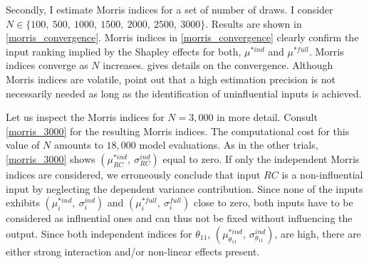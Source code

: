 Secondly, I estimate Morris indices for a set of number of draws. I consider $N \in \{100,\ 500,\ 1000,\ 1500,\ 2000,\ 2500,\ 3000\}$. Results are shown in \cref{morris_convergence}. Morris indices in
\cref{morris_convergence} clearly confirm the input ranking implied by the Shapley effects for both, $\mu^{\ast ind}$ and $\mu^{\ast full}$. Morris indices
converge as $N$ increases.  gives details on the convergence. Although Morris indices are volatile, \citet{GM17} point out that a high estimation precision is not necessarily needed
as long as the identification of uninfluential inputs is achieved.

Let us inspect the Morris indices for $N = 3,000$ in more detail. Consult \cref{morris_3000} for the
resulting Morris indices. The computational cost for this value of $N$ amounts to $18,000$
model evaluations. As in the other trials, \cref{morris_3000} shows $(\mu^{\ast ind}_{RC},\ \sigma_{RC}^{ind})$ equal to zero.
If only the independent Morris indices are considered, we erroneously
conclude that input $RC$ is a non-influential input by neglecting the dependent variance contribution. Since none of the inputs exhibits $(\mu^{\ast ind}_i,\ \sigma_i^{ind})$ and $(\mu^{\ast full}_i,\ \sigma_i^{full})$ close to zero, both inputs have to be considered as influential ones and can thus not be fixed without influencing the output.
Since both independent indices for $\theta_{11}$, $(\mu^{\ast ind}_{\theta_{11}},\ \sigma_{\theta_{11}}^{ind})$, are high, there are either strong interaction and/or non-linear effects present.
